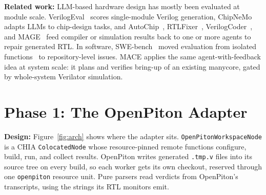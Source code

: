 \documentclass[10pt,conference,compsoc]{IEEEtran}
\newcommand{\code}[1]{\texttt{\small #1}}
\newcommand{\sys}{MACE}
\begin{document}
\textbf{Related work:} LLM-based hardware design has mostly been evaluated at module scale.
VerilogEval~\cite{verilogeval} scores single-module Verilog generation, ChipNeMo~\cite{chipnemo}
adapts LLMs to chip-design tasks, and AutoChip~\cite{autochip}, RTLFixer~\cite{rtlfixer},
VerilogCoder~\cite{verilogcoder}, and MAGE~\cite{mage} feed compiler or simulation results back to
one or more agents to repair generated RTL. In software, SWE-bench~\cite{swebench} moved evaluation
from isolated functions~\cite{humaneval} to repository-level issues. \sys{} applies the same
agent-with-feedback idea at system scale: it plans and verifies bring-up of an existing manycore,
gated by whole-system Verilator simulation.

\section{Phase 1: The OpenPiton Adapter}
\label{sec:phase1}

\textbf{Design:} Figure~\ref{fig:arch} shows where the adapter sits. \code{OpenPitonWorkspaceNode} is
a CHIA \code{ColocatedNode} whose resource-pinned remote functions configure, build, run, and
collect results. OpenPiton writes generated \code{.tmp.v} files into its source tree on every build,
so each worker gets its own checkout, reserved through one \code{openpiton} resource unit. Pure
parsers read verdicts from OpenPiton's transcripts, using the strings its RTL monitors emit.
\end{document}
